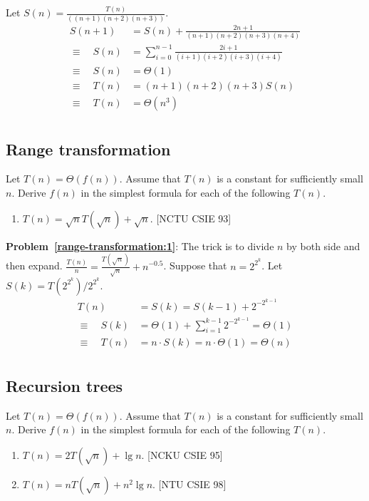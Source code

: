 \begin{refsection}
\begin{Answer}
Let $S(n) = \frac{T(n)}{((n+1)(n+2)(n+3))}$.
\begin{align*}
S(n+1) & = S(n) + \frac{2n+1}{(n+1)(n+2)(n+3)(n+4)} \\
\equiv \quad S(n) &= \sum_{i=0}^{n-1} \frac{2i+1}{(i+1)(i+2)(i+3)(i+4)}\\
\equiv \quad S(n) &= \Theta(1) \\
\equiv \quad T(n) &= (n+1)(n+2)(n+3)S(n) \\
\equiv \quad T(n) &= \Theta(n^3) \\
\end{align*}
\end{Answer}


\subsection{Range transformation}
\begin{Exercise}
Let $T(n) = \Theta(f(n))$. Assume that $T(n)$ is a constant for sufficiently small $n$. Derive $f(n)$ in the simplest formula for each of the following $T(n)$.
\begin{enumerate}
\item $T(n) = \sqrt{n} T(\sqrt{n}) + \sqrt{n}$. \label{range-transformation:1} [NCTU CSIE 93]
\end{enumerate}
\end{Exercise}
\begin{Answer}

{\bf Problem~\ref{range-transformation:1}}: The trick is to divide $n$ by both side and then expand.
$\frac{T(n)}{n} =  \frac{T(\sqrt{n})}{\sqrt{n}} + n^{-0.5}$.
Suppose that $n = 2^{2^k}$. Let $S(k) = T(2^{2^k})/2^{2^k}$. 
\begin{align*}
T(n) & = S(k) = S(k-1) + 2^{-2^{k-1}} \\
\equiv \quad S(k) &= \Theta(1) + \sum_{i=1}^{k-1} 2^{-2^{k-1}} = \Theta(1) \\
\equiv \quad T(n) &= n \cdot S(k) = n \cdot \Theta(1) = \Theta(n) \\
\end{align*}
\end{Answer}

\subsection{Recursion trees}
\begin{Exercise}
Let $T(n) = \Theta(f(n))$. Assume that $T(n)$ is a constant for sufficiently small $n$. Derive $f(n)$ in the simplest formula for each of the following $T(n)$.
\begin{enumerate}
\item $T(n) = 2T(\sqrt{n}) + \lg n$. \label{recursion-trees:1} [NCKU CSIE 95]
\item $T(n) = nT(\sqrt{n}) + n^2 \lg n$. \label{recursion-trees:2} [NTU CSIE 98]
\end{enumerate}
\end{Exercise}
\begin{Answer}


\end{Answer}
\end{refsection}
